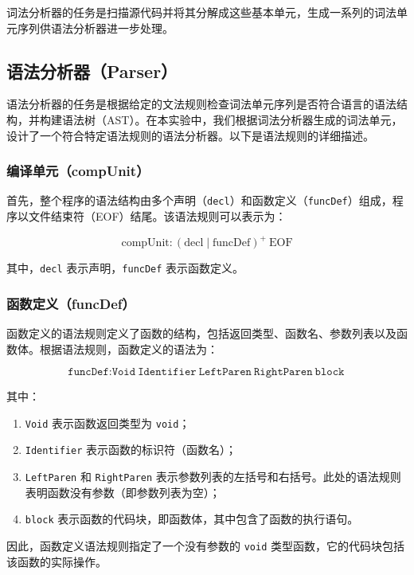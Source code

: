 \documentclass[../main.tex]{subfiles}
\begin{document}
词法分析器的任务是扫描源代码并将其分解成这些基本单元，生成一系列的词法单元序列供语法分析器进一步处理。

\subsection{语法分析器（Parser）}

语法分析器的任务是根据给定的文法规则检查词法单元序列是否符合语言的语法结构，并构建语法树（AST）。在本实验中，我们根据词法分析器生成的词法单元，设计了一个符合特定语法规则的语法分析器。以下是语法规则的详细描述。

\subsubsection{编译单元（compUnit）}

首先，整个程序的语法结构由多个声明（\texttt{decl}）和函数定义（\texttt{funcDef}）组成，程序以文件结束符（EOF）结尾。该语法规则可以表示为：

\[
	\text{compUnit} \colon (\text{decl} \mid \text{funcDef})^+ \ \text{EOF}
\]

其中，\texttt{decl} 表示声明，\texttt{funcDef} 表示函数定义。

\subsubsection{函数定义（funcDef）}

函数定义的语法规则定义了函数的结构，包括返回类型、函数名、参数列表以及函数体。根据语法规则，函数定义的语法为：

\[
	\texttt{funcDef} \colon \texttt{Void} \ \texttt{Identifier} \ \texttt{LeftParen} \ \texttt{RightParen} \ \texttt{block}
\]

其中：
\begin{enumerate}
	\item \texttt{Void} 表示函数返回类型为 \texttt{void}；
	\item \texttt{Identifier} 表示函数的标识符（函数名）；
	\item \texttt{LeftParen} 和 \texttt{RightParen} 表示参数列表的左括号和右括号。此处的语法规则表明函数没有参数（即参数列表为空）；
	\item \texttt{block} 表示函数的代码块，即函数体，其中包含了函数的执行语句。
\end{enumerate}

因此，函数定义语法规则指定了一个没有参数的 \texttt{void} 类型函数，它的代码块包括该函数的实际操作。
\end{document}
